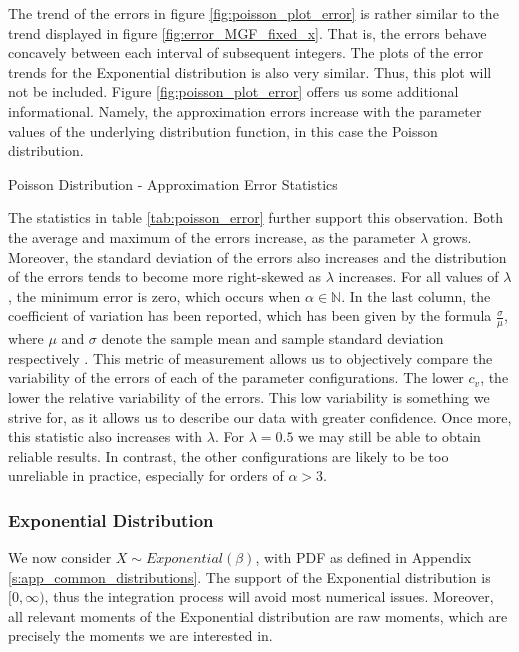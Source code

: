 The trend of the errors in figure \ref{fig:poisson_plot_error} is rather similar to the trend displayed in figure \ref{fig:error_MGF_fixed_x}. That is, the errors behave concavely between each interval of subsequent integers. The plots of the error trends for the Exponential distribution is also very similar. Thus, this plot will not be included. Figure \ref{fig:poisson_plot_error} offers us some additional informational. Namely, the approximation errors increase with the parameter values of the underlying distribution function, in this case the Poisson distribution.


\begin{table}[H]
    \centering

\caption{Poisson Distribution - Approximation Error Statistics} 
\label{tab:poisson_error}
\end{table}
The statistics in table \ref{tab:poisson_error} further support this observation.
Both the average and maximum of the errors increase, as the parameter \(\lambda\) grows. Moreover, the standard deviation of the errors also increases and the distribution of the errors tends to become more right-skewed as \(\lambda\) increases. For all values of \(\lambda\), the minimum error is zero, which occurs when \(\alpha \in \mathbb{N}\). In the last column, the coefficient of variation has been reported, which has been given by the formula \(\displaystyle \frac{\sigma}{\mu}\), where \(\mu\) and \(\sigma\) denote the sample mean and sample standard deviation respectively \citep{hendricks1936}. This metric of measurement allows us to objectively compare the variability of the errors of each of the parameter configurations. The lower \(c_v\), the lower the relative variability of the errors. This low variability is something we strive for, as it allows us to describe our data with greater confidence. Once more, this statistic also increases with \(\lambda\). For \(\lambda = 0.5\) we may still be able to obtain reliable results. In contrast, the other configurations are likely to be too unreliable in practice, especially for orders of \(\alpha > 3\).

\subsubsection{Exponential Distribution}
We now consider \(X \sim Exponential(\beta)\), with PDF as defined in Appendix \ref{s:app_common_distributions}.
The support of the Exponential distribution is \([0, \infty)\), thus the integration process will avoid most numerical issues. Moreover, all relevant moments of the Exponential distribution are raw moments, which are precisely the moments we are interested in.
\newline

